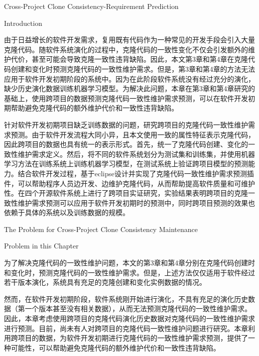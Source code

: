 
{Cross-Project Clone Consistency-Requirement Prediction}

{Introduction}

由于日益增长的软件开发需求，复用既有代码作为一种常见的开发手段会引入大量克隆代码。随软件系统演化的过程中，克隆代码的一致性变化不仅会引发额外的维护代价，甚至可能会导致克隆一致性违背缺陷。因此，本文第3章和第4章在克隆代码创建和变化时预测克隆代码的一致性维护需求。但是，第3章和第4章的方法无法应用于软件开发初期阶段的系统中。因为在此阶段软件系统没有经过充分的演化，缺少历史演化数据训练机器学习模型。为解决此问题，本章在第3章和第4章研究的基础上，使用跨项目的数据预测克隆代码一致性维护需求预测，可以在软件开发初期帮助避免克隆代码的额外维护代价和一致性违背缺陷。

针对软件开发初期项目缺乏训练数据的问题，研究跨项目的克隆代码一致性维护需求预测。由于软件开发流程大同小异，且本文使用一致的属性特征表示克隆代码，因此跨项目的数据也具有统一的表示形式。首先，统一了克隆代码创建、变化的一致性维护需求定义。然后，将不同的软件系统划分为测试集和训练集，并使用机器学习方法在训练系统上训练机器学习模型，在测试系统上验证跨项目模型的预测能力。结合软件开发过程，基于eclipse设计并实现了克隆代码一致性维护需求预测插件，可以帮助程序人员边开发、边维护克隆代码，从而帮助提高软件质量和可维护性。在四个开源软件系统上进行了跨项目实证研究，实验结果表明跨项目的克隆一致性维护需求预测可以应用于软件开发初期时的预测中，同时跨项目预测的效果也依赖于具体的系统以及训练数据的规模。

{The Problem for Cross-Project Clone Consistency Maintenance}

{Problem in this Chapter}


为了解决克隆代码的一致性维护问题，本文的第3章和第4章分别在克隆代码创建时和变化时，预测克隆代码的一致性维护需求。但是，上述方法仅仅适用于软件经过若干版本演化，系统具有充足的克隆创建和变化实例数据的情况。

然而，在软件开发初期阶段，软件系统刚开始进行演化，不具有充足的演化历史数据（第一个版本甚至没有相关数据），从而无法预测克隆代码的一致性维护需求。因此，本章考虑使用跨项目的克隆代码演化历史数据对克隆代码的一致性维护需求进行预测。目前，尚未有人对跨项目的克隆代码一致性维护问题进行研究。本章利用跨项目的数据，为软件开发初期进行克隆代码的一致性维护需求预测，提供了一种可能性，可以帮助避免克隆代码的额外维护代价和一致性违背缺陷。

